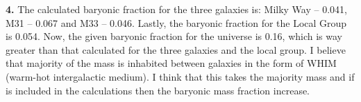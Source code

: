 \documentclass{article}
\begin{document}
\noindent \textbf{4.}	 The calculated baryonic fraction for the three galaxies is: Milky Way – 0.041, M31 – 0.067 and M33 – 0.046. Lastly, the baryonic fraction for the Local Group is 0.054. Now, the given baryonic fraction for the universe is 0.16, which is way greater than that calculated for the three galaxies and the local group. I believe that majority of the mass is inhabited between galaxies in the form of WHIM (warm-hot intergalactic medium). I think that this takes the majority mass and if is included in the calculations then the baryonic mass fraction increase. 
\end{document}
